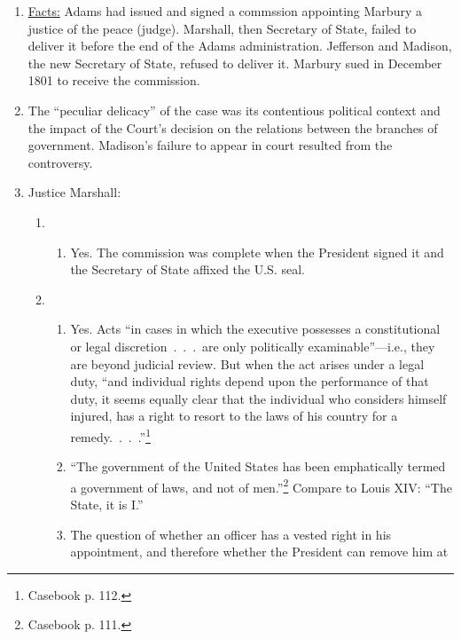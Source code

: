\begin{enumerate}
    \item \underline{Facts:} Adams had issued and signed a commssion appointing Marbury a justice of 
    the peace (judge). Marshall, then Secretary of State, failed to deliver it before 
    the end of the Adams administration. Jefferson and Madison, the new 
    Secretary of State, refused to deliver it. Marbury sued in December 1801 
    to receive the commission.
    \item The ``peculiar delicacy'' of the case was its contentious political 
    context and the impact of the Court's decision on the relations between 
    the branches of government. Madison's failure to appear in court resulted 
    from the controversy.
    \item Justice Marshall:
    \begin{enumerate}
        \item {}
        \begin{enumerate}
            \item Yes. The commission was complete when the President signed 
            it and the Secretary of State affixed the U.S. seal.
        \end{enumerate}
        \item {}
        \begin{enumerate}
            \item Yes. Acts ``in cases in which the executive possesses a 
            constitutional or legal discretion~.~.~.~are only politically 
            examinable''---i.e., they are beyond judicial review. But when the 
            act arises under a legal duty, ``and individual rights depend upon 
            the performance of that duty, it seems equally clear that the 
            individual who considers himself injured, has a right to resort to 
            the laws of his country for a remedy.~.~.~.''\footnote{Casebook p.  
            112.} 
            \item ``The government of the United States has been emphatically 
            termed a government of laws, and not of men.''\footnote{Casebook 
            p. 111.} Compare to Louis XIV: ``The State, it is I.''
            \item The question of whether an officer has a vested right in his 
            appointment, and therefore whether the President can remove him at 

\end{enumerate}
\end{enumerate}
\end{enumerate}
